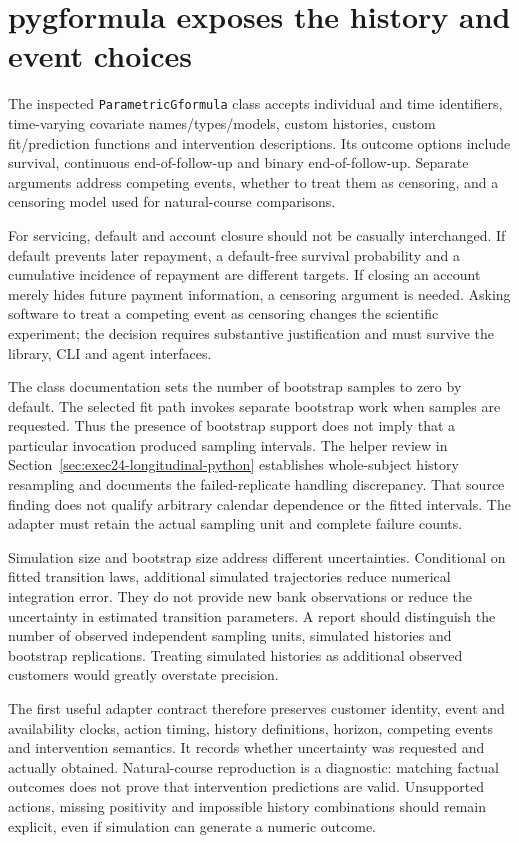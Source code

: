 \section{pygformula exposes the history and event choices}

The inspected \texttt{ParametricGformula} class accepts individual and time
identifiers, time-varying covariate names/types/models, custom histories, custom
fit/prediction functions and intervention descriptions. Its outcome options
include survival, continuous end-of-follow-up and binary end-of-follow-up.
Separate arguments address competing events, whether to treat them as censoring,
and a censoring model used for natural-course comparisons. \cite{v13_sw_pygformula}

For servicing, default and account closure should not be casually interchanged.
If default prevents later repayment, a default-free survival probability and a
cumulative incidence of repayment are different targets. If closing an account
merely hides future payment information, a censoring argument is needed. Asking
software to treat a competing event as censoring changes the scientific
experiment; the decision requires substantive justification and must survive
the library, CLI and agent interfaces.

The class documentation sets the number of bootstrap samples to zero by
default. The selected fit path invokes separate bootstrap work when samples
are requested. Thus the presence of bootstrap support does not imply that a
particular invocation produced sampling intervals. The helper review in
Section~\ref{sec:exec24-longitudinal-python} establishes whole-subject history
resampling and documents the failed-replicate handling discrepancy. That source
finding does not qualify arbitrary calendar dependence or the fitted intervals.
The adapter must retain the actual sampling unit and complete failure counts.
\cite{v13_sw_pygformula}

Simulation size and bootstrap size address different uncertainties. Conditional
on fitted transition laws, additional simulated trajectories reduce numerical
integration error. They do not provide new bank observations or reduce the
uncertainty in estimated transition parameters. A report should distinguish
the number of observed independent sampling units, simulated histories and
bootstrap replications. Treating simulated histories as additional observed
customers would greatly overstate precision.

The first useful adapter contract therefore preserves customer identity, event
and availability clocks, action timing, history definitions, horizon, competing
events and intervention semantics. It records whether uncertainty was requested
and actually obtained. Natural-course reproduction is a diagnostic: matching
factual outcomes does not prove that intervention predictions are valid.
Unsupported actions, missing positivity and impossible history combinations
should remain explicit, even if simulation can generate a numeric outcome.

